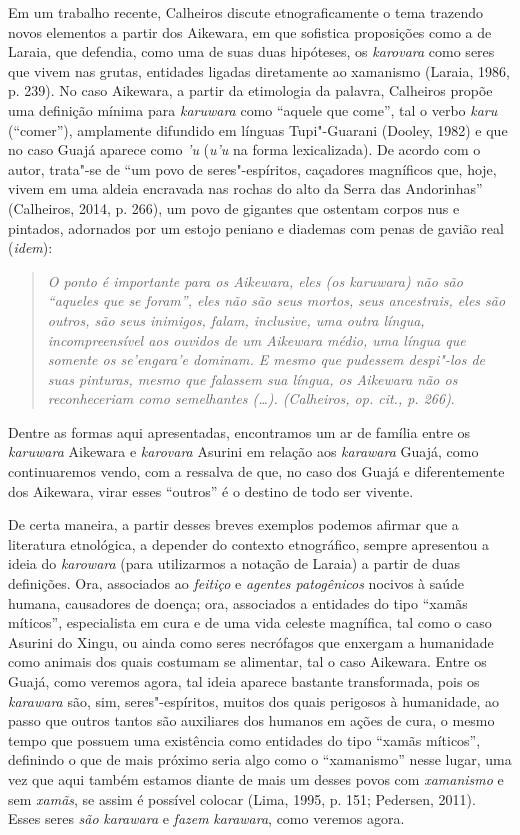 Em um trabalho recente, Calheiros discute etnograficamente o tema
trazendo novos elementos a partir dos Aikewara, em que sofistica
proposições como a de Laraia, que defendia, como uma de suas duas
hipóteses, os \emph{karovara} como seres que vivem nas grutas, entidades
ligadas diretamente ao xamanismo (Laraia, 1986, p. 239). No caso
Aikewara, a partir da etimologia da palavra, Calheiros propõe uma
definição mínima para \emph{karuwara} como ``aquele que come'', tal o
verbo \emph{karu} (``comer''), amplamente difundido em línguas
Tupi"-Guarani (Dooley, 1982) e que no caso Guajá aparece como \emph{'u}
(\emph{u'u} na forma lexicalizada). De acordo com o autor, trata"-se de
``um povo de seres"-espíritos, caçadores magníficos que, hoje, vivem em
uma aldeia encravada nas rochas do alto da Serra das Andorinhas''
(Calheiros, 2014, p. 266), um povo de gigantes que ostentam corpos nus e
pintados, adornados por um estojo peniano e diademas com penas de gavião
real (\emph{idem}):

\begin{quote}
\emph{O ponto é importante para os Aikewara, eles (os \emph{karuwara}) não
são ``aqueles que se foram'', eles não são seus mortos, seus ancestrais,
eles são outros, são seus inimigos, falam, inclusive, uma outra língua,
incompreensível aos ouvidos de um Aikewara médio, uma língua que somente
os \emph{se'engara'e} dominam. E mesmo que pudessem despi"-los de suas
pinturas, mesmo que falassem sua língua, os Aikewara não os
reconheceriam como semelhantes (\ldots{}). (Calheiros, \emph{op. cit.}, p. 266)}.
\end{quote}

Dentre as formas aqui apresentadas, encontramos um ar de família entre
os \emph{karuwara} Aikewara e \emph{karovara} Asurini em relação aos
\emph{karawara} Guajá, como continuaremos vendo, com a ressalva de que,
no caso dos Guajá e diferentemente dos Aikewara, virar esses ``outros''
é o destino de todo ser vivente.

De certa maneira, a partir desses breves exemplos podemos afirmar que a
literatura etnológica, a depender do contexto etnográfico, sempre
apresentou a ideia do \emph{karowara} (para utilizarmos a notação de
Laraia) a partir de duas definições. Ora, associados ao \emph{feitiço} e
\emph{agentes patogênicos} nocivos à saúde humana, causadores de doença;
ora, associados a entidades do tipo ``xamãs míticos'', especialista em
cura e de uma vida celeste magnífica, tal como o caso Asurini do Xingu,
ou ainda como seres necrófagos que enxergam a humanidade como animais
dos quais costumam se alimentar, tal o caso Aikewara. Entre os Guajá,
como veremos agora, tal ideia aparece bastante transformada, pois os
\emph{karawara} são, sim, seres"-espíritos, muitos dos quais perigosos à
humanidade, ao passo que outros tantos são auxiliares dos humanos em
ações de cura, o mesmo tempo que possuem uma existência como entidades
do tipo ``xamãs míticos'', definindo o que de mais próximo seria algo como
o ``xamanismo'' nesse lugar, uma vez que aqui também estamos diante de
mais um desses povos com \emph{xamanismo} e sem \emph{xamãs}, se assim é
possível colocar (Lima, 1995, p. 151; Pedersen, 2011). Esses seres
\emph{são} \emph{karawara} e \emph{fazem} \emph{karawara}, como veremos
agora.

